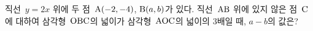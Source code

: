 직선~$y=2x$ 위에 두 점~$\mathrm{A}(-2{,}\mkern3mu\mathopen{}-4)$, $\mathrm{B}(a{,}\mkern3mu\mathopen{}b)$가 있다. 직선~$\mathrm{AB}$ 위에 있지 않은 점~$\mathrm{C}$에 대하여 삼각형~$\mathrm{OBC}$의 넓이가 삼각형~$\mathrm{AOC}$의 넓이의 $3$배일 때, $a-b$의 값은? 
